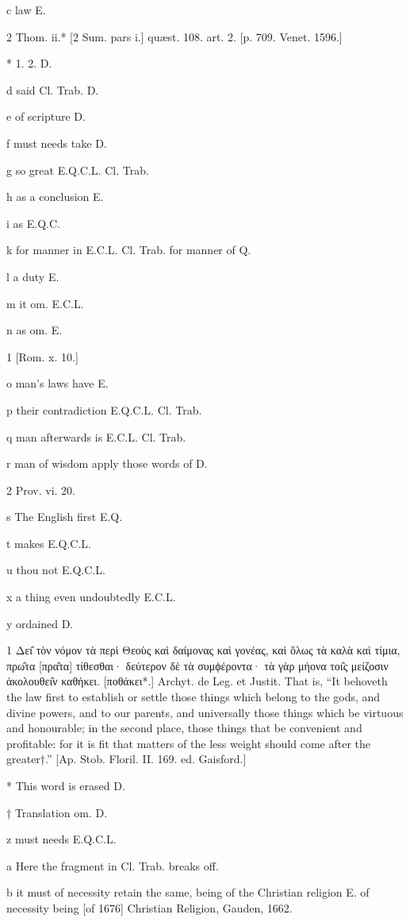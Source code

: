 c
law E.

2
Thom. ii.* [2 Sum. pars i.] quæst. 108. art. 2. [p. 709. Venet. 1596.]

*
1. 2. D.

d
said Cl. Trab. D.

e
of scripture D.

f
must needs take D.

g
so great E.Q.C.L. Cl. Trab.

h
as a conclusion E.

i
as E.Q.C.

k
for manner in E.C.L. Cl. Trab. for manner of Q.

l
a duty E.

m
it om. E.C.L.

n
as om. E.

1
[Rom. x. 10.]

o
man’s laws have E.

p
their contradiction E.Q.C.L. Cl. Trab.

q
man afterwards is E.C.L. Cl. Trab.

r
man of wisdom apply those words of D.

2
Prov. vi. 20.

s
The English first E.Q.

t
makes E.Q.C.L.

u
thou not E.Q.C.L.

x
a thing even undoubtedly E.C.L.

y
ordained D.

1
Δει̑ τὸν νόμον τὰ περὶ Θεοὺς καὶ δαίμονας καὶ γονέας, καὶ ὅλως τὰ καλὰ καὶ τίμια, πρω̑τα [πρα̑τα] τίθεσθαι· δεύτερον δὲ τὰ συμϕέροντα· τὰ γὰρ μήονα τοι̑ς μείζοσιν ἀκολουθει̑ν καθήκει. [ποθάκει*.] Archyt. de Leg. et Justit. That is, “It behoveth the law first to establish or settle those things which belong to the gods, and divine powers, and to our parents, and universally those things which be virtuous and honourable; in the second place, those things that be convenient and profitable: for it is fit that matters of the less weight should come after the greater†.” [Ap. Stob. Floril. II. 169. ed. Gaisford.]

*
This word is erased D.

†
Translation om. D.

z
must needs E.Q.C.L.

a
Here the fragment in Cl. Trab. breaks off.

b
it must of necessity retain the same, being of the Christian religion E. of necessity being [of 1676] Christian Religion, Gauden, 1662.

